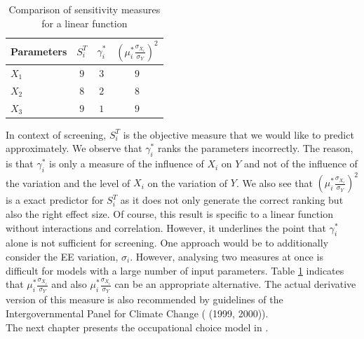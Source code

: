 \documentclass[a4paper,12pt]{article}
\begin{document}
\begin{table}[H]
	\centering
	\caption{Comparison of sensitivity measures for a linear function}
	\label{tab:bad-mu}
	\begin{tabular}{@{}lccc@{}}
		\toprule
		Parameters & $S_i^T$ & $\gamma_i^*$ & $(\mu_i^* \frac{\sigma_{X_i}}{\sigma_Y})^2$ \\ \midrule
		$X_1$ & $9$                       & $3$   & $9$   \\
		$X_2$ & $8$                       & $2$   & $8$   \\
		$X_3$ & $9$                       & $1$   & $9$   \\ \bottomrule
	\end{tabular}
\end{table}

\noindent
In context of screening, $S_i^T$ is the objective measure that we would like to predict approximately. We observe that $\gamma_i^*$ ranks the parameters incorrectly. The reason, is that $\gamma_i^*$ is only a measure of the influence of $X_i$ on $Y$ and not of the influence of the variation and the level of $X_i$ on the variation of $Y$. We also see that $(\mu_i^* \frac{\sigma_{X_i}}{\sigma_Y})^2$ is a exact predictor for $S_i^T$ as it does not only generate the correct ranking but also the right effect size. Of course, this result is specific to a linear function without interactions and correlation. However, it underlines the point that $\gamma_i^*$ alone is not sufficient for screening. One approach would be to additionally consider the EE variation, $\sigma_i$. However, analysing two measures at once is difficult for models with a large number of input parameters. Table \ref{tab:bad-mu} indicates that $\mu_i^* \frac{\sigma_{X_i}}{\sigma_Y}$ and also $\mu_i^* \frac{\sigma_{X_i}}{\sigma_Y}$ can be an appropriate alternative. The actual derivative version of this measure is also recommended by guidelines of the Intergovernmental Panel for Climate Change (\citeauthor{ipcc1999} (1999, 2000)).\\



\noindent
The next chapter presents the occupational choice model in \cite{Keane.1994}.

\newpage

\end{document}
